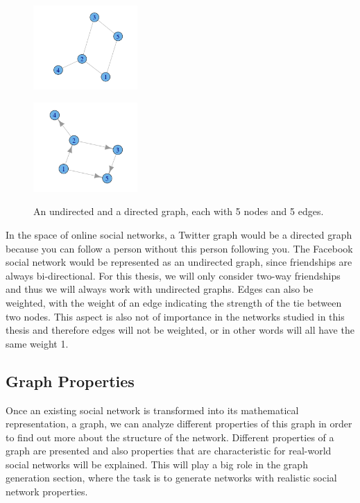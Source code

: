 \begin{figure}[!ht]
\centering
\begin{minipage}[b]{5 cm}
\includegraphics[width=150px]{./2-recommendersystemssocialnetworks/figures/SampleGraph.png}
\label{f:simplegraph}
\end{minipage}
\begin{minipage}[b]{5 cm}
\includegraphics[width=150px]{./2-recommendersystemssocialnetworks/figures/SampleGraph2.png}
\label{f:simplegraph}
\end{minipage}
\caption[An undirected and a directed graph, each with 5 nodes and 5 edges.]
{An undirected and a directed graph, each with 5 nodes and 5 edges.}
\end{figure}

In the space of online social networks, a Twitter graph would be a directed graph because you can follow a person without this person following you. The Facebook social network would be represented as an undirected graph, since friendships are always bi-directional. For this thesis, we will only consider two-way friendships and thus we will always work with undirected graphs. Edges can also be weighted, with the weight of an edge indicating the strength of the tie between two nodes. This aspect is also not of importance in the networks studied in this thesis and therefore edges will not be weighted, or in other words will all have the same weight 1.

\subsection{Graph Properties}
\label{sst:graphproperties} Once an existing social network is transformed into its mathematical representation, a graph, we can analyze different properties of this graph in order to find out more about the structure of the network. Different properties of a graph are presented and also properties that are characteristic for real-world social networks will be explained. This will play a big role in the graph generation section, where the task is to generate networks with realistic social network properties.
\newline

